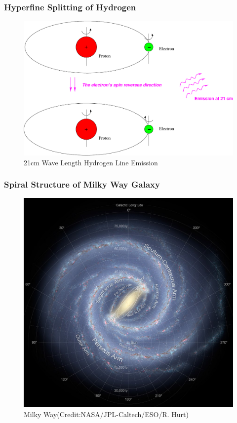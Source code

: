 \documentclass{beamer}
\begin{document}

\begin{frame}
\frametitle{Hyperfine Splitting of Hydrogen}
\begin{figure}
\caption{21cm Wave Length Hydrogen Line Emission}
\includegraphics[width=0.8\linewidth]{hyperfine}
\end{figure}
\end{frame}


\begin{frame}
\frametitle{Spiral Structure of Milky Way Galaxy}
\begin{figure}
\caption{Milky Way(Credit:NASA/JPL-Caltech/ESO/R. Hurt)}
\includegraphics[width=0.5\linewidth]{milkyway.jpg}
\end{figure}
\end{frame}

\end{document}
